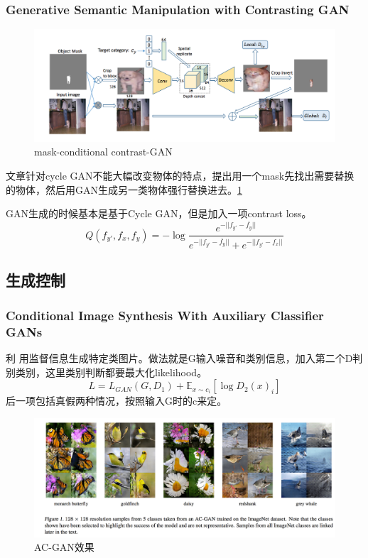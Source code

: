 \documentclass[a4paper]{article}
\begin{document}
\subsubsection{Generative Semantic Manipulation with Contrasting GAN\cite{semantic_replace}}
\begin{figure}
\centering
\includegraphics[width=\textwidth]{./img/37.png}
\caption{mask-conditional contrast-GAN}
\label{fig:37}\end{figure}
文章针对cycle GAN不能大幅改变物体的特点，提出用一个mask先找出需要替换的物体，然后用GAN生成另一类物体强行替换进去。\ref{fig:37}

GAN生成的时候基本是基于Cycle GAN，但是加入一项contrast loss。
$$Q(f_{y'},f_x,f_y)=-\log \frac{e^{-||f_{y'}-\overline{f_y}||}}
{e^{-||f_{y'}-\overline{f_y}||} + e^{-||f_{y'}-f_x||}}$$

\subsection{生成控制}
\subsubsection{Conditional Image Synthesis With Auxiliary Classifier GANs\cite{DBLP:journals/corr/OdenaOS16}}
利
用监督信息生成特定类图片。做法就是G输入噪音和类别信息，加入第二个D判别类别，这里类别判断都要最大化likelihood。
$$L = L_{GAN}(G,D_1) + \mathbb{E}_{x\sim c_i}[\log D_2(x)_i]$$
后一项包括真假两种情况，按照输入G时的c来定。
\begin{figure}
\centering
\includegraphics[width=\textwidth]{./img/14.png}
\caption{AC-GAN效果}
\label{fig:14}
\end{figure}
\end{document}
